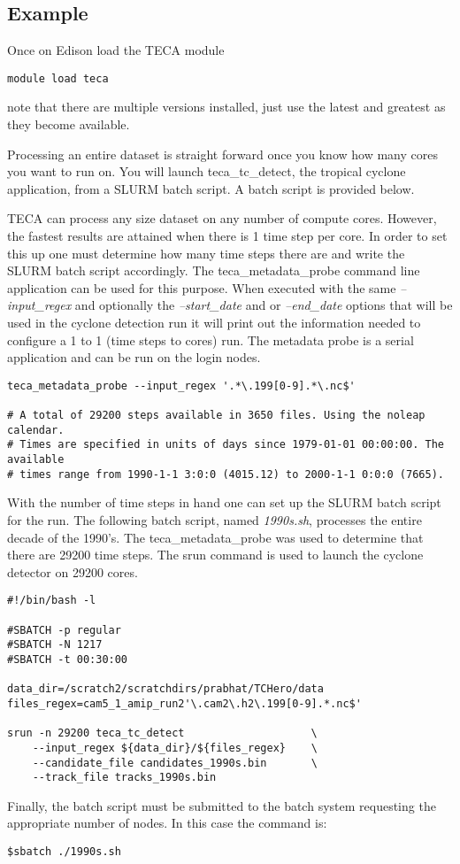 \documentclass[a4paper,10pt,DIV=12]{scrreprt}
\begin{document}
\subsection{Example}
Once on Edison load the TECA module
\begin{verbatim}
module load teca
\end{verbatim}
note that there are multiple versions installed, just use the latest and greatest as they become available.

Processing an entire dataset is straight forward once you know how many cores you want to run on. You will launch teca\_tc\_detect, the tropical cyclone application, from a SLURM batch script. A batch script is provided below.

TECA can process any size dataset on any number of compute cores. However, the fastest results are attained when there is 1 time step per core. In order to set this up one must determine how many time steps there are and write the SLURM batch script accordingly. The teca\_metadata\_probe command line application can be used for this purpose. When executed with the same \textit{--input\_regex} and optionally the \textit{--start\_date} and or \textit{--end\_date} options that will be used in the cyclone detection run it will print out the information needed to configure a 1 to 1 (time steps to cores) run. The metadata probe is a serial application and can be run on the login nodes.

\begin{verbatim}
teca_metadata_probe --input_regex '.*\.199[0-9].*\.nc$'

# A total of 29200 steps available in 3650 files. Using the noleap calendar.
# Times are specified in units of days since 1979-01-01 00:00:00. The available
# times range from 1990-1-1 3:0:0 (4015.12) to 2000-1-1 0:0:0 (7665).
\end{verbatim}

With the number of time steps in hand one can set up the SLURM batch script for the run. The following batch script, named \textit{1990s.sh}, processes the entire decade of the 1990's. The teca\_metadata\_probe was used to determine that there are 29200 time steps. The srun command is used to launch the cyclone detector on 29200 cores.
\begin{verbatim}
#!/bin/bash -l

#SBATCH -p regular
#SBATCH -N 1217
#SBATCH -t 00:30:00

data_dir=/scratch2/scratchdirs/prabhat/TCHero/data
files_regex=cam5_1_amip_run2'\.cam2\.h2\.199[0-9].*.nc$'

srun -n 29200 teca_tc_detect                    \
    --input_regex ${data_dir}/${files_regex}    \
    --candidate_file candidates_1990s.bin       \
    --track_file tracks_1990s.bin
\end{verbatim}
Finally, the batch script must be submitted to the batch system requesting the appropriate number of nodes. In this case the command is:
\begin{verbatim}
$sbatch ./1990s.sh
\end{verbatim}
\end{document}
